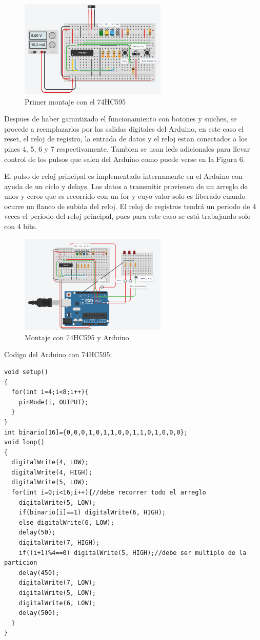 \documentclass{article}
\begin{document}
\begin{figure}[ht]
\includegraphics[width=7cm]{montaje0.PNG}
\centering
\caption{Primer montaje con el 74HC595}
\end{figure}

Despues de haber garantizado el funcionamiento con botones y suiches, se procede a reemplazarlos por las salidas digitales del Arduino, en este caso el reset, el reloj de registro, la entrada de datos y el reloj estan conectados a los pines 4, 5, 6 y 7 respectivamente. Tambien se usan leds adicionales para llevar control de los pulsos que salen del Arduino como puede verse en la Figura 6.

El pulso de reloj principal es implementado internamente en el Arduino con ayuda de un ciclo y delays. Los datos a transmitir provienen de un arreglo de unos y ceros que es recorrido con un for y cuyo valor solo es liberado  cuando ocurre un flanco de subida del reloj. El reloj de registros tendrá un periodo de 4 veces el periodo del reloj principal, pues para este caso se está trabajando solo con 4 bits.


\begin{figure}[!ht] 
\includegraphics[width=7cm]{montaje1.PNG}
\centering
\caption{Montaje con 74HC595 y Arduino}
\end{figure}

\noindent
Codigo del Arduino con 74HC595:

\begin{lstlisting}[style=C++]
void setup()
{
  for(int i=4;i<8;i++){
  	pinMode(i, OUTPUT);
  }  
}
int binario[16]={0,0,0,1,0,1,1,0,0,1,1,0,1,0,0,0};
void loop()
{
  digitalWrite(4, LOW);
  digitalWrite(4, HIGH);
  digitalWrite(5, LOW);
  for(int i=0;i<16;i++){//debe recorrer todo el arreglo
    digitalWrite(5, LOW);
    if(binario[i]==1) digitalWrite(6, HIGH);
    else digitalWrite(6, LOW);
    delay(50);
    digitalWrite(7, HIGH);
    if((i+1)%4==0) digitalWrite(5, HIGH);//debe ser multiplo de la particion
    delay(450);
    digitalWrite(7, LOW);
    digitalWrite(5, LOW);
    digitalWrite(6, LOW);
    delay(500); 
  }
}
\end{lstlisting}
\end{document}

